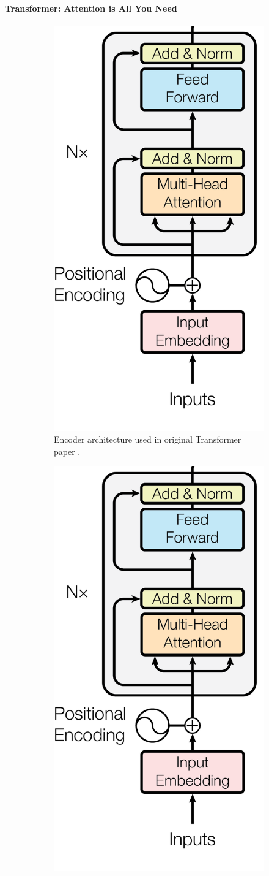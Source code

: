 \paragraph{Transformer: Attention is All You Need}
\begin{figure}[!htb]
\begin{subfigure}{0.5\textwidth}
    \centering
    \includegraphics[width=0.5\linewidth]{modeling/transformer.png}  
    \caption{Encoder architecture used in original Transformer paper \citep{attentionAllYouNeed}.}
    \label{modeling.transformer.origEncoder}
\end{subfigure}
\begin{subfigure}{0.5\textwidth}
    \centering
    \includegraphics[width=0.5\linewidth]{modeling/transformer.png}   

\end{subfigure}
\end{figure}

